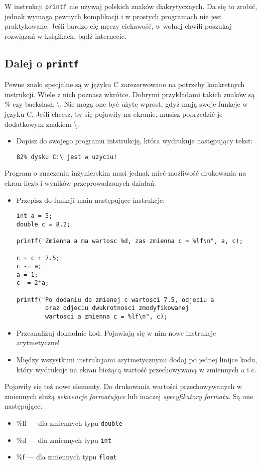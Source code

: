 \documentclass{instrukcja}
\begin{document}
W instrukcji {\tt printf} nie używaj polskich znaków diakrytycznych. Da się to zrobić, jednak wymaga pewnych komplikacji i w prostych programach nie jest praktykowane. Jeśli bardzo cię męczy ciekawość, w wolnej chwili poszukaj rozwiązań w książkach, bądź internecie.

\subsection*{Dalej o {\tt printf}}
Pewne znaki specjalne są w języku C zarezerwowane na potrzeby konkretnych instrukcji. Wiele z nich poznasz wkrótce. Dobrymi przykładami takich znaków są \% czy backslash \textbackslash{}. Nie mogą one być użyte wprost, gdyż mają swoje funkcje w języku C. Jeśli chcesz, by się pojawiły na ekranie, musisz poprzedzić je dodatkowym znakiem \textbackslash{}.
\begin{itemize}
\item Dopisz do swojego programu intstrukcję, która wydrukuje następujący tekst:
\begin{verbatim}
82% dysku C:\ jest w uzyciu!
\end{verbatim}
\end{itemize}
Program o znaczeniu inżynierskim musi jednak mieć możliwość drukowania na ekran liczb i wyników przeprowadzonych działań.
\begin{itemize}
\item Przepisz do funkcji main następujące instrukcje:
\begin{verbatim}
int a = 5;
double c = 8.2;

printf("Zmienna a ma wartosc %d, zas zmienna c = %lf\n", a, c);

c = c + 7.5;
c -= a;
a = 1;
c -= 2*a;

printf("Po dodaniu do zmienej c wartosci 7.5, odjeciu a
        oraz odjeciu dwukrotnosci zmodyfikowanej
        wartosci a zmienna c = %lf\n", c);
\end{verbatim}
\item Przeanalizuj dokładnie kod. Pojawiają się w nim nowe instrukcje arytmetyczne!
\item Między wszystkimi instrukcjami arytmetycznymi dodaj po jednej linijce kodu, który wydrukuje na ekran bieżącą wartość przechowywaną w zmiennych a i c.
\end{itemize}
Pojawiły się też nowe elementy. Do drukowania wartości przechowywanych w zmiennych służą {\it sekwencje formatujące} lub inaczej {\it specyfikatory formatu}. Są one następujące:
\begin{itemize}
\item \%lf --- dla zmiennych typu {\tt double}
\item \%d --- dla zmiennych typu {\tt int}
\item \%f --- dla zmiennych typu {\tt float}
\end{itemize}
\end{document}
